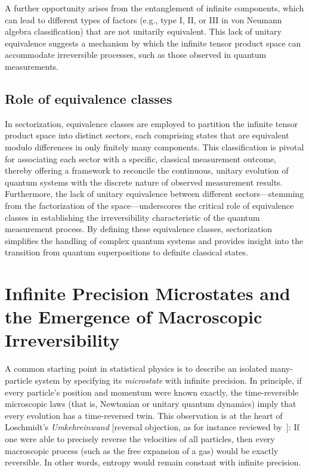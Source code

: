 \documentclass[shortAfour,sageh,times]{sagej}
\begin{document}
A further opportunity arises from the entanglement of infinite components, which can lead to different types of factors (e.g., type I, II, or III in von Neumann algebra classification) that are not unitarily equivalent. This lack of unitary equivalence suggests a mechanism by which the infinite tensor product space can accommodate irreversible processes, such as those observed in quantum measurements.

\subsection{Role of equivalence classes}


In sectorization, equivalence classes are employed to partition the infinite tensor product space into distinct sectors, each comprising states that are equivalent modulo differences in only finitely many components.
This classification is pivotal for associating each sector with a specific, classical measurement outcome, thereby offering a framework to reconcile the continuous, unitary evolution of quantum systems with the discrete nature of observed measurement results.
Furthermore, the lack of unitary equivalence between different sectors---stemming from the factorization of the space---underscores the critical role of equivalence classes in establishing the irreversibility characteristic of the quantum measurement process.
By defining these equivalence classes, sectorization simplifies the handling of complex quantum systems and provides insight into the transition from quantum superpositions to definite classical states.


\section{Infinite Precision Microstates and the Emergence of Macroscopic Irreversibility}

A common starting point in statistical physics is to describe an isolated many-particle system by specifying its \emph{microstate} with infinite precision.
In principle, if every particle's position and momentum were known exactly, the time-reversible microscopic laws (that is, Newtonian or unitary quantum dynamics) imply that every evolution has a time-reversed twin.
This observation is at the heart of Loschmidt's \textit{Umkehreinwand} [reversal objection, as for instance reviewed by~\cite{darrigol-2021}]:
If one were able to precisely reverse the velocities of all particles, then every macroscopic process (such as the free expansion of a gas) would be exactly reversible.
In other words, entropy would remain constant with infinite precision.
\end{document}
